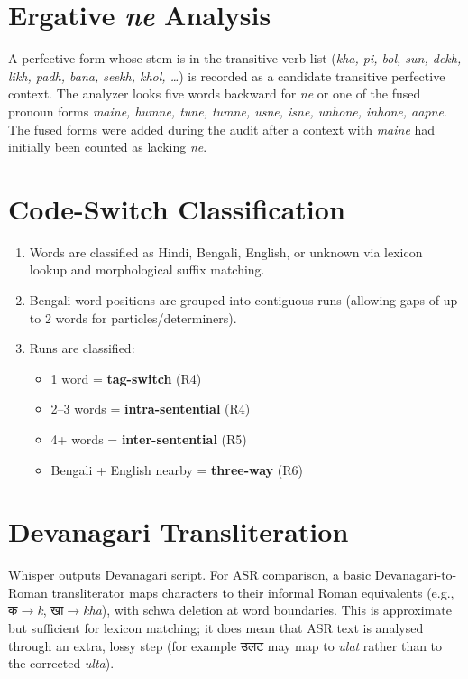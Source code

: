 \documentclass[11pt,a4paper]{report}
\newcommand{\deva}[1]{{\devafont #1}}
\newcommand{\deva}[1]{\textit{[Devanagari]}}
\begin{document}
\section{Ergative \textit{ne} Analysis}

A perfective form whose stem is in the transitive-verb list (\textit{kha, pi, bol, sun, dekh, likh, padh, bana, seekh, khol, \ldots}) is recorded as a candidate transitive perfective context. The analyzer looks five words backward for \textit{ne} or one of the fused pronoun forms \textit{maine, humne, tune, tumne, usne, isne, unhone, inhone, aapne}. The fused forms were added during the audit after a context with \textit{maine} had initially been counted as lacking \textit{ne}.

\section{Code-Switch Classification}

\begin{enumerate}
  \item Words are classified as Hindi, Bengali, English, or unknown via lexicon lookup and morphological suffix matching.
  \item Bengali word positions are grouped into contiguous runs (allowing gaps of up to 2 words for particles/determiners).
  \item Runs are classified:
  \begin{itemize}
    \item 1 word = \textbf{tag-switch} (R4)
    \item 2--3 words = \textbf{intra-sentential} (R4)
    \item 4+ words = \textbf{inter-sentential} (R5)
    \item Bengali + English nearby = \textbf{three-way} (R6)
  \end{itemize}
\end{enumerate}

\section{Devanagari Transliteration}

Whisper outputs Devanagari script. For ASR comparison, a basic Devanagari-to-Roman transliterator maps characters to their informal Roman equivalents (e.g., \deva{क}$\to$\textit{k}, \deva{खा}$\to$\textit{kha}), with schwa deletion at word boundaries. This is approximate but sufficient for lexicon matching; it does mean that ASR text is analysed through an extra, lossy step (for example \deva{उलट} may map to \textit{ulat} rather than to the corrected \textit{ulta}).
\end{document}
